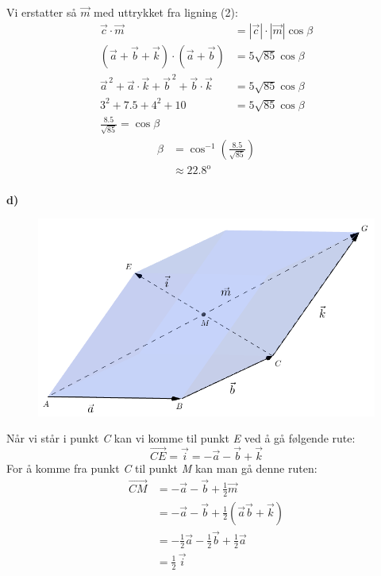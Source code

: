 \documentclass[english, 11 pt]{report}
\begin{document}
Vi erstatter så $ \vec m $ med uttrykket fra ligning (2):
\begin{align*}
\vec c \cdot \vec m &= |\vec c| \cdot |\vec m| \cos \beta \\
\left(\vec a + \vec b + \vec k\right)\cdot \left(\vec a + \vec b\right) &= 5 \sqrt{85} \cos \beta \\
\vec{a}^{\,2}+ \vec a \cdot \vec k + \vec{b}^{\,2} + \vec b \cdot \vec k &= 5 \sqrt{85} \cos \beta \\
3^2 + 7.5 + 4^2 + 10 &= 5 \sqrt{85} \cos \beta \\
\frac{8.5}{\sqrt{85}} = \cos \beta
\end{align*}
\begin{align*}
\beta & = \cos^{-1}\left(\frac{8.5}{\sqrt{85}}\right) \\
 & \approx 22.8^{\mathrm{o}}
\end{align*} \\

\textbf{d)}

\begin{figure}[H]
	\centering
	\includegraphics[scale=0.5]{fig3}
\end{figure}

Når vi står i punkt \textit{C} kan vi komme til punkt \textit{E} ved å gå følgende rute:
\begin{equation}
\overrightarrow{CE}= \vec{i}= -\vec a -\vec b + \vec k \label{vek3}
\end{equation}
For å komme fra punkt \textit{C} til punkt \textit{M} kan man gå denne ruten:
\begin{align*}
\overrightarrow{CM} &= -\vec a -\vec b + \frac{1}{2} \vec m \\
& = -\vec a -\vec b + \frac{1}{2} \left(\vec a \vec b + \vec k\right) \\
&= - \frac{1}{2} \vec a - \frac{1}{2} \vec b + \frac{1}{2} \vec a \\
& = \frac{1}{2}\, \vec{i}
\end{align*}
\end{document}
